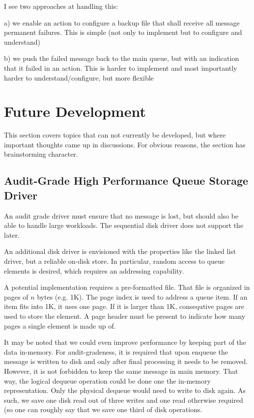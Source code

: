 \documentclass[a4paper,10pt]{article}
\begin{document}
I see two approaches at handling this:

a) we enable an action to configure a backup file that shall receive all
message permanent failures. This is simple (not only to implement but to
configure and understand)

b) we push the failed message back to the main queue, but with an indication
that it failed in an action. This is harder to implement and most importantly
harder to understand/configure, but more flexible

\section{Future Development}
This section covers topics that can not currently be developed, but where important thoughts came up in discussions. For obvious reasons, the section has brainstorming character.

\subsection{Audit-Grade High Performance Queue Storage Driver}
An audit grade driver must ensure that no message is lost, but should also be able to handle large workloads. The sequential disk driver does not support the later.

An additional disk driver is envisioned with the properties like the linked list driver, but a reliable on-disk store. In particular, random access to queue elements is desired, which requires an addressing capability.

A potential implementation requires a pre-formatted file. That file is organized in pages of $n$ bytes (e.g. 1K). The page index is used to address a queue item. If an item fits into 1K, it uses one page. If it is larger than 1K, consequtive pages are used to store the element. A page header must be present to indicate how many pages a single element is made up of.

It may be noted that we could even improve performance by keeping part of the data in-memory. For audit-gradeness, it is required that upon enqueue the message is written to disk and only after final processing it needs to be removed. However, it is not forbidden to keep the same message in main memory. That way, the logical dequeue operation could be done one the in-memory representation. Only the physical dequeue would need to write to disk again. As such, we save one disk read out of three writes and one read otherwise required (so one can roughly say that we save one third of disk operations.
\end{document}
